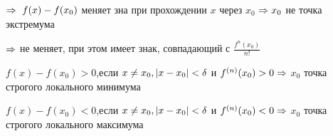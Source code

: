 \begin{proofs}
\begin{dokvo}
	\begin{enumerate*}
		\item {} $\Rightarrow \ f(x) - f(x_0)$ меняет зна при прохождении $x$ через $x_0$ $\Rightarrow x_0$ не точка экстремума
		\item {} $\Rightarrow$ не меняет, при этом имеет знак, совпадающий с $\frac{f^{n}(x_0)}{n!}$
		\begin{itemize*}
			\item $f(x) - f(x_0)>0$,если $x \neq x_0, \left| x- x_0\right| < \delta$ и $f^{(n)}(x_0)>0 \Rightarrow$ $x_0$ точка строгого локального минимума
			\item $f(x) - f(x_0)<0$,если $x \neq x_0, \left| x- x_0\right| < \delta$ и $f^{(n)}(x_0)<0 \Rightarrow$ $x_0$ точка строгого локального максимума
		\end{itemize*}
	\end{enumerate*}
\end{dokvo}
\end{proofs}
\newpage
